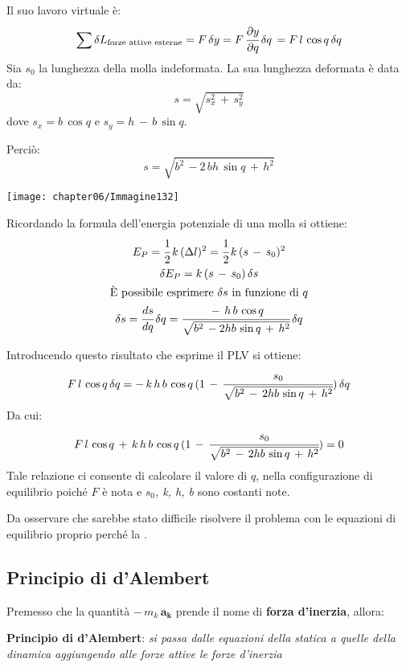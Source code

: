 	\begin{minipage}{.5\textwidth}
	Il suo lavoro virtuale è:
	\[\sum \delta L_{\text{forze attive esterne}} = F\,\delta y=F\,\cfrac{\partial y}{\partial q}\,\delta q\,= F\,l\,\cos{q}\,\delta q\]
	Sia $s_0$ la lunghezza della molla indeformata. La sua lunghezza deformata è data da:
	\[s = \sqrt{s_x^2\,+\,s_y^2}\]
	dove $s_x=b\,\cos{q}$ e $s_y = h\,-\,b\,\sin{q}$.
	
	Perciò:
	\[s = \sqrt{b^2\,-2\,bh\,\sin{q}\,+\,h^2}\]
	\end{minipage}
	\hfill
	\begin{minipage}{.5\textwidth}
	\centering
	\texttt{[image: chapter06/Immagine132]}
	\end{minipage}

Ricordando la formula dell'energia potenziale di una molla si ottiene:
\begin{gather*}
E_P = \cfrac{1}{2}\,k\,(\Delta l)^2 = \cfrac{1}{2}\,k\,(s\,-\,s_0)^2\\
\delta E_P = k\,(s\,-\,s_0)\,\delta s\\
\text{È possibile esprimere $\delta s$ in funzione di $q$}\\
\delta s = \cfrac{ds}{dq}\,\delta q = \cfrac{-\,h\,b\,\cos{q}}{\sqrt{b^2\,-2hb\,\sin{q}\,+\,h^2}}\,\delta q
\end{gather*}

Introducendo questo risultato che esprime il PLV si ottiene:
\[F\,l\,\cos{q}\,\delta q = -\,k\,h\,b\,\cos{q}\,(1\,-\,\cfrac{s_0}{\sqrt{b^2\,-\,2hb\,\sin{q}\,+\,h^2}})\,\delta q\]
Da cui:
\[F\,l\,\cos{q}\,+\,k\,h\,b\,\cos{q}\,(1\,-\,\cfrac{s_0}{\sqrt{b^2\,-\,2hb\,\sin{q}\,+\,h^2}}) = 0\]
Tale relazione ci consente di calcolare il valore di $q$, nella configurazione di equilibrio poiché $F$ è nota e \emph{$s_0$, k, h, b} sono costanti note.

Da osservare che sarebbe stato difficile risolvere il problema con le equazioni di equilibrio proprio perché la .

\subsection{Principio di d'Alembert}

Premesso che la quantità $-\,m_k\,\mathbf{a_k}$ prende il nome di \textbf{forza d'inerzia}, allora:\newline

\textbf{Principio di d'Alembert}: \emph{si passa dalle equazioni della statica a quelle della dinamica aggiungendo alle forze attive le forze d'inerzia}\newline


